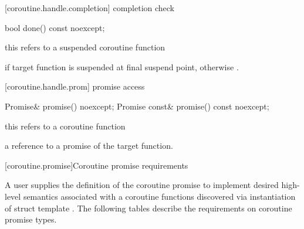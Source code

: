 [coroutine.handle.completion]{ completion check}
\begin{itemdecl}
  bool done() const noexcept; 
\end{itemdecl}
\begin{itemdescr}
  \pnum
  \precondition *this refers to a suspended coroutine function
  
  \pnum
  \returns {} if target function is suspended
  at final suspend point, otherwise .
\end{itemdescr}

[coroutine.handle.prom]{ promise access}
\begin{itemdecl}
  Promise& promise() noexcept;		
  Promise const& promise() const noexcept;
\end{itemdecl}

\begin{itemdescr}
  \pnum
  \precondition *this refers to a coroutine function
  
  \pnum
  \returns a reference to a promise of the target function.
\end{itemdescr}


[coroutine.promise]{Coroutine promise requirements}

\pnum
A user supplies the definition of the coroutine promise to implement 
desired high-level semantics associated with a coroutine functions
discovered via instantiation of struct template .
The following tables describe the requirements on
coroutine promise types.


